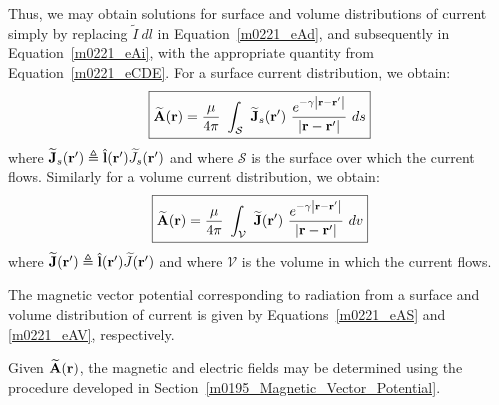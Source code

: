 Thus, we may obtain solutions for surface and volume distributions of current simply by replacing $\widetilde{I}~dl$ in Equation~\ref{m0221_eAd}, and subsequently in Equation~\ref{m0221_eAi}, with the appropriate quantity from Equation~\ref{m0221_eCDE}.
For a surface current distribution, we obtain:
%
\begin{equation}
\boxed{
\widetilde{\bf A}({\bf r}) = \frac{\mu}{4\pi}~\int_{\mathcal{S}}~\widetilde{\bf J}_s({\bf r}') ~\frac{e^{-\gamma \left|{\bf r}-{\bf r}'\right|}}{\left|{\bf r}-{\bf r}'\right|} ~ds
}
\label{m0221_eAS}
\end{equation}
%
where $\widetilde{\bf J}_s({\bf r}') \triangleq \hat{\bf l}({\bf r}')\widetilde{J}_s({\bf r}')$ and
where $\mathcal{S}$ is the surface over which the current flows.
Similarly for a volume current distribution, we obtain:
%
\begin{equation}
\boxed{
\widetilde{\bf A}({\bf r}) = \frac{\mu}{4\pi}~\int_{\mathcal{V}} ~\widetilde{\bf J}({\bf r}') ~\frac{e^{-\gamma \left|{\bf r}-{\bf r}'\right|}}{\left|{\bf r}-{\bf r}'\right|} ~dv
}
\label{m0221_eAV}
\end{equation}
where $\widetilde{\bf J}({\bf r}') \triangleq \hat{\bf l}({\bf r}')\widetilde{J}({\bf r}')$ and
where $\mathcal{V}$ is the volume in which the current flows.
%
\begin{mdframed}[backgroundcolor=yellow!20,nobreak=true] 
The magnetic vector potential corresponding to radiation from a surface and volume distribution of current is given by Equations~\ref{m0221_eAS} and \ref{m0221_eAV}, respectively. 
\end{mdframed}

Given $\widetilde{\bf A}({\bf r})$, the magnetic and electric fields may be determined using the procedure developed in Section~\ref{m0195_Magnetic_Vector_Potential}.

